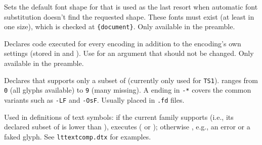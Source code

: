 \documentclass{l3in2edoc}
\begin{document}
\begin{function}[user]
  {
    \DeclareFontSubstitution
  }
  \begin{syntax}
        
  \end{syntax}
  Sets the default font shape for  that is used as the
  last resort when automatic font substitution doesn't find the
  requested shape. These fonts must exist (at least in one size),
  which is checked at \texttt{\{document\}}. Only available
  in the preamble.
\end{function}




\begin{function}[user]
  {
    \DeclareFontEncodingDefaults
  }
  \begin{syntax}
      
  \end{syntax}
  Declares code executed for every encoding in addition to the
  encoding's own settings (stored in  and
  ). Use  for an argument that should not
  be changed. Only available in the preamble.
\end{function}



\begin{function}[user]
  {
    \DeclareEncodingSubset
  }
  \begin{syntax}
       
  \end{syntax}
  Declares that  supports only a subset of
   (currently only used for \texttt{TS1}).
   ranges from \texttt{0} (all glyphs available) to
  \texttt{9} (many missing). A  ending in \texttt{-*}
  covers the common variants such as \texttt{-LF} and
  \texttt{-OsF}. Usually placed in \texttt{.fd} files.
\end{function}



\begin{function}[user]
  {
    \CheckEncodingSubset
  }
  \begin{syntax}
         
  \end{syntax}
  Used in definitions of text symbols: if the current family supports
   (i.e., its declared subset of  is
  lower than ), executes 
  ( or );
  otherwise , e.g., an error or a faked
  glyph. See \texttt{lttextcomp.dtx} for examples.
\end{function}
\end{document}
